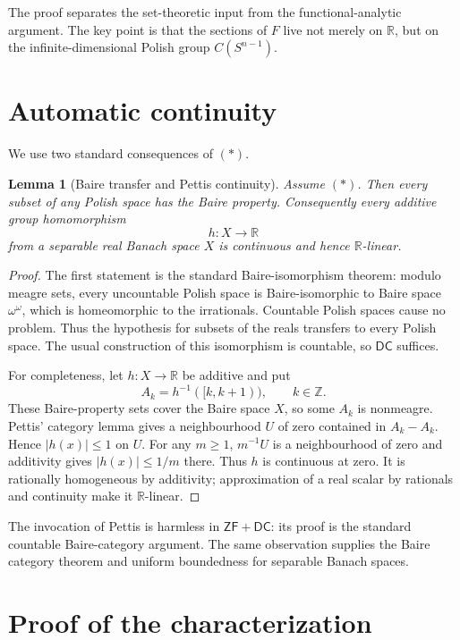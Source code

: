 \documentclass[11pt]{article}
\newtheorem{lemma}{Lemma}
\newcommand{\ZF}{\mathsf{ZF}}
\newcommand{\DC}{\mathsf{DC}}
\newcommand{\R}{\mathbb R}
\newcommand{\Sph}{S^{n-1}}
\newcommand{\C}{C(\Sph)}
\begin{document}
The proof separates the set-theoretic input from the functional-analytic
argument.  The key point is that the sections of $F$ live not merely on
$\R$, but on the infinite-dimensional Polish group $\C$.

\section{Automatic continuity}

We use two standard consequences of $(\ast)$.

\begin{lemma}[Baire transfer and Pettis continuity]\label{lem:pettis}
Assume $(\ast)$.  Then every subset of any Polish space has the Baire
property.  Consequently every additive group homomorphism
\[
 h:X\longrightarrow\R
\]
from a separable real Banach space $X$ is continuous and hence $\R$-linear.
\end{lemma}

\begin{proof}
The first statement is the standard Baire-isomorphism theorem: modulo meagre
sets, every uncountable Polish space is Baire-isomorphic to Baire space
$\omega^\omega$, which is homeomorphic to the irrationals.  Countable Polish
spaces cause no problem.  Thus the hypothesis for subsets of the reals
transfers to every Polish space.  The usual construction of this isomorphism
is countable, so $\DC$ suffices.

For completeness, let $h:X\to\R$ be additive and put
\[
 A_k=h^{-1}([k,k+1)),\qquad k\in\mathbb Z.
\]
These Baire-property sets cover the Baire space $X$, so some $A_k$ is
nonmeagre.  Pettis' category lemma gives a neighbourhood $U$ of zero contained
in $A_k-A_k$.  Hence $|h(x)|\le1$ on $U$.  For any $m\ge1$, $m^{-1}U$ is a
neighbourhood of zero and additivity gives $|h(x)|\le1/m$ there.  Thus $h$ is
continuous at zero.  It is rationally homogeneous by additivity; approximation
of a real scalar by rationals and continuity make it $\R$-linear.
\end{proof}

The invocation of Pettis is harmless in $\ZF+\DC$: its proof is the standard
countable Baire-category argument.  The same observation supplies the Baire
category theorem and uniform boundedness for separable Banach spaces.

\section{Proof of the characterization}
\end{document}
